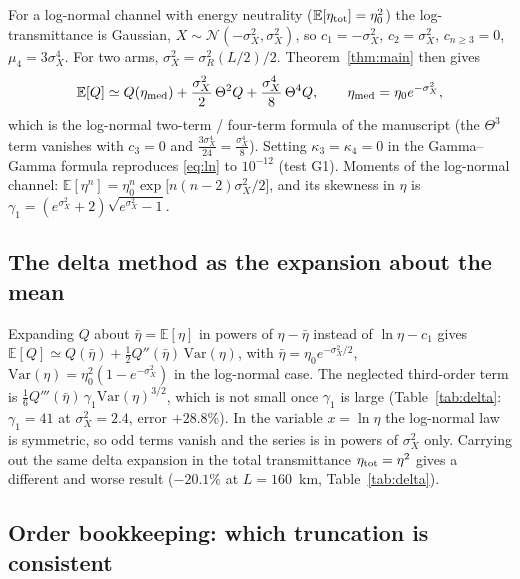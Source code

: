 For a log-normal channel with energy neutrality ($\mathbb E[\eta_{\rm tot}]=\eta_0^2$) the log-transmittance is Gaussian, $X\sim\mathcal N(-\sigma_X^2,\sigma_X^2)$, so $c_1=-\sigma_X^2$, $c_2=\sigma_X^2$, $c_{n\ge3}=0$, $\mu_4=3\sigma_X^4$. For two arms, $\sigma_X^2=\sigma_R^2(L/2)/2$. Theorem~\ref{thm:main} then gives
\begin{equation}
  \mathbb E[Q]\simeq Q(\eta_{\rm med})+\frac{\sigma_X^2}{2}\,\Theta^2Q+\frac{\sigma_X^4}{8}\,\Theta^4Q,\qquad \eta_{\rm med}=\eta_0e^{-\sigma_X^2},
  \label{eq:ln}
\end{equation}
which is the log-normal two-term / four-term formula of the manuscript (the $\Theta^3$ term vanishes with $c_3=0$ and $\tfrac{3\sigma_X^4}{24}=\tfrac{\sigma_X^4}{8}$). Setting $\kappa_3=\kappa_4=0$ in the Gamma--Gamma formula reproduces \eqref{eq:ln} to $10^{-12}$ (test G1). Moments of the log-normal channel: $\mathbb E[\eta^n]=\eta_0^n\exp\!\big[n(n-2)\sigma_X^2/2\big]$, and its skewness in $\eta$ is $\gamma_1=(e^{\sigma_X^2}+2)\sqrt{e^{\sigma_X^2}-1}$.

\subsection{The delta method as the expansion about the mean}

Expanding $Q$ about $\bar\eta=\mathbb E[\eta]$ in powers of $\eta-\bar\eta$ instead of $\ln\eta-c_1$ gives
$\mathbb E[Q]\simeq Q(\bar\eta)+\tfrac12Q''(\bar\eta)\,\mathrm{Var}(\eta)$, with $\bar\eta=\eta_0e^{-\sigma_X^2/2}$, $\mathrm{Var}(\eta)=\eta_0^2(1-e^{-\sigma_X^2})$ in the log-normal case. The neglected third-order term is $\tfrac16Q'''(\bar\eta)\,\gamma_1\mathrm{Var}(\eta)^{3/2}$, which is not small once $\gamma_1$ is large (Table~\ref{tab:delta}: $\gamma_1=41$ at $\sigma_X^2=2.4$, error $+28.8\%$). In the variable $x=\ln\eta$ the log-normal law is symmetric, so odd terms vanish and the series is in powers of $\sigma_X^2$ only. Carrying out the same delta expansion in the total transmittance $\eta_{\rm tot}=\eta^2$ gives a different and worse result ($-20.1\%$ at $L=160$~km, Table~\ref{tab:delta}).

\subsection{Order bookkeeping: which truncation is consistent}
\label{sec:order}

